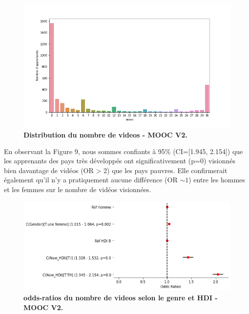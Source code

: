 \documentclass[12pt, a4paper, titlepage, table]{article}
\begin{document}
\begin{figure}[H]
	\centering
	\includegraphics[width=1\textwidth]{../../graph/distribution_poisson.png}
	\caption{\textbf{Distribution du nombre de videos - MOOC V2.}}
\end{figure}

En observant la Figure 9,  nous sommes confiants à 95\% (CI=[1.945, 2.154]) que les apprenants des pays très développés ont significativement (p=0) visionnés bien davantage de vidéos (OR > 2) que les pays pauvres. Elle confirmerait également qu'il n'y a pratiquement aucune différence (OR $\sim 1$) entre les hommes et les femmes sur le nombre de vidéos visionnées.

\begin{figure}[H]
	\centering
	\includegraphics[width=1\textwidth]{../../graph/forestplot_V2_poisson.png}
	\caption{\textbf{odds-ratios du nombre de videos selon le genre et HDI - MOOC V2.}}
\end{figure}
\end{document}
